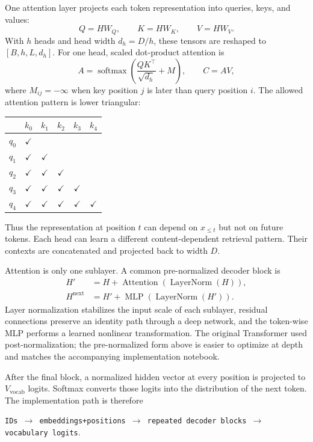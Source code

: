 One attention layer projects each token representation into queries, keys, and values:
\begin{equation}
  Q=HW_Q,\qquad K=HW_K,\qquad V=HW_V.
\end{equation}
With $h$ heads and head width $d_h=D/h$, these tensors are reshaped to
$[B,h,L,d_h]$. For one head, scaled dot-product attention is
\begin{equation}
  A=\operatorname{softmax}\!\left(\frac{QK^\top}{\sqrt{d_h}}+M\right),
  \qquad C=AV,
\end{equation}
where $M_{ij}=-\infty$ when key position $j$ is later than query position $i$.
The allowed attention pattern is lower triangular:
\begin{center}
\begin{tabular}{c|ccccc}
  & $k_0$ & $k_1$ & $k_2$ & $k_3$ & $k_4$ \\
  \hline
  $q_0$ & $\checkmark$ & & & & \\
  $q_1$ & $\checkmark$ & $\checkmark$ & & & \\
  $q_2$ & $\checkmark$ & $\checkmark$ & $\checkmark$ & & \\
  $q_3$ & $\checkmark$ & $\checkmark$ & $\checkmark$ & $\checkmark$ & \\
  $q_4$ & $\checkmark$ & $\checkmark$ & $\checkmark$ & $\checkmark$ & $\checkmark$
\end{tabular}
\end{center}
Thus the representation at position $t$ can depend on $x_{\leq t}$ but not on future
tokens. Each head can learn a different content-dependent retrieval pattern. Their
contexts are concatenated and projected back to width $D$.

Attention is only one sublayer. A common pre-normalized decoder block is
\begin{align}
  H' &= H+\operatorname{Attention}(\operatorname{LayerNorm}(H)),\\
  H^{\mathrm{next}} &= H'+\operatorname{MLP}(\operatorname{LayerNorm}(H')).
\end{align}
Layer normalization stabilizes the input scale of each sublayer, residual connections
preserve an identity path through a deep network, and the token-wise MLP performs a
learned nonlinear transformation. The original Transformer used post-normalization;
the pre-normalized form above is easier to optimize at depth and matches the accompanying
implementation notebook.

After the final block, a normalized hidden vector at every position is projected to
$V_{\mathrm{vocab}}$ logits. Softmax converts those logits into the distribution of the
next token. The implementation path is therefore
\begin{center}
\texttt{IDs $\rightarrow$ embeddings+positions $\rightarrow$ repeated decoder blocks
$\rightarrow$ vocabulary logits}.
\end{center}

